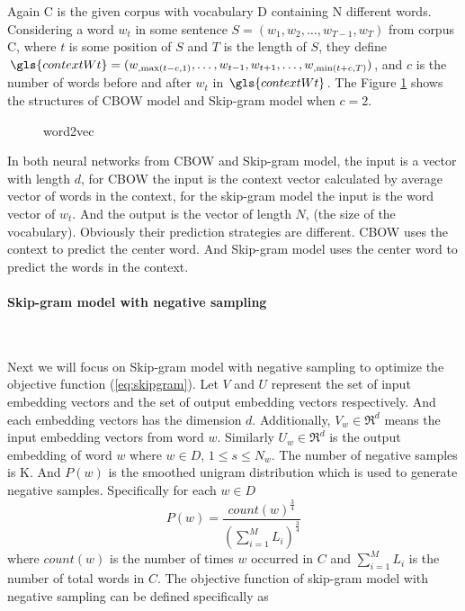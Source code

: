Again \gls{C} is the given corpus with vocabulary \gls{D} containing  \gls{N} different words. Considering a word $w_t$ in some sentence $S = (w_1,w_2,\ldots,w_{T-1},w_{T})$ from corpus \gls{C}, where $t$ is some position of $S$ and $T$ is the length of $S$, they define $\gls{contextWt} = (w_{,\max(t-c,1)},\ldots,w_{t-1},w_{t+1},\ldots,w_{,\min(t+c,T)})$, and $c$ is the number of words before and after $w_t$ in  $\gls{contextWt} $. The Figure \ref{fig:word2vec} shows the structures of CBOW model and Skip-gram model when $c=2$. 
\begin{figure}[!ht]
  \centering
	\caption{word2vec}
	\label{fig:word2vec}
\end{figure}

In both neural networks from CBOW and Skip-gram model, the input is a vector with length $d$, for CBOW the input is the context vector calculated by average vector of words in the context, for the skip-gram model the input is the word vector of $w_t$. And the output is the vector of length $N$, (the size of the vocabulary). Obviously their prediction strategies are different. CBOW uses the context to predict the center word. And Skip-gram model uses the center word to predict the words in the context.  

\paragraph{Skip-gram model with negative sampling}\ 

Next we will focus on Skip-gram model with negative sampling to optimize the objective function  (\ref{eq:skipgram}). Let $V$ and $U$ represent  the set of input embedding vectors and the set of output embedding vectors respectively. And each embedding vectors has the dimension $d$. Additionally, $V_{w} \in \Re^d$ %
means the input embedding vectors from word $w$. Similarly
$U_{w} \in \Re^d$ %
is the output embedding of word $w$ where  $w\in D$, $1\leq s\leq N_w$. The number of negative samples is \gls{K}. %
And $P(w)$ is the smoothed unigram distribution which is used to generate negative samples. Specifically for each $w\in D$
$$P(w) = \frac{count(w)^{\frac{3}{4}}}{(\sum_{i=1}^M L_i)^{\frac{3}{4}}}$$ 
where $count(w)$ is the number of times $w$ occurred in $C$ and $\sum_{i=1}^M L_i$ is the number of total words in $C$. The objective function of skip-gram model with negative sampling can be defined specifically as

